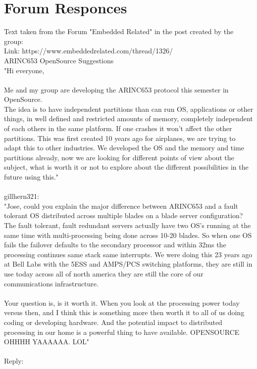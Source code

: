 \chapter{Forum Responces}

Text taken from the Forum "Embedded Related" in the post created by the group:\\
Link: https://www.embeddedrelated.com/thread/1326/\\

ARINC653 OpenSource Suggestions\\

"Hi everyone,\\
\\

Me and my group are developing the ARINC653 protocol this semester in OpenSource.\\
The idea is to have independent partitions than can run OS, applications or other things, in well defined
and restricted amounts of memory, completely independent of each others in the same platform. If one
crashes it won't affect the other partitions. This was first created 10 years ago for airplanes, we are
trying to adapt this to other industries. We developed the OS and the memory and time partitions already,
now we are looking for different points of view about the subject, what is worth it or not to explore 
about the different possibilities in the future using this."\\
\\
gillhern321:\\

"Jose, could you explain the major difference between ARINC653 and a fault tolerant OS distributed across 
multiple blades on a blade server configuration? The fault tolerant, fault redundant servers actually have 
two OS's running at the same time with multi-processing being done across 10-20 blades. So when one OS 
fails the failover defaults to the secondary processor and within 32ms the processing continues same stack 
same interrupts. We were doing this 23 years ago at Bell Labs with the 5ESS and AMPS/PCS switching 
platforms, they are still in use today across all of north america they are still the core of our 
communications infrastructure.\\
\\

Your question is, is it worth it. When you look at the processing power today versus then,  and I think 
this is something more then worth it to all of us doing coding or developing hardware. And the potential 
impact to distributed processing in our home is a powerful thing to have available.  OPENSOURCE     OHHHH 
YAAAAAA. LOL"\\
\\
Reply:\\

